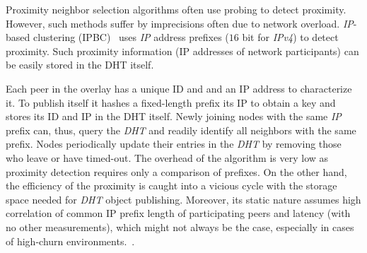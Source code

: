 Proximity neighbor selection algorithms often use probing to detect proximity. 
However, such methods suffer by imprecisions often due to network overload.
{\sl IP}-based clustering (IPBC)~\cite{KM2007} uses {\sl IP} address prefixes
($16$ bit for {\sl IPv4}) to detect proximity.
Such proximity information (IP addresses of network participants) can be
easily stored in the DHT itself.

Each peer in the overlay has a unique ID and and an IP address to
characterize it. To publish itself it hashes a fixed-length prefix
its IP to obtain a key and stores its ID and IP in the DHT itself. 
Newly joining nodes with the same {\sl IP} prefix 
can, thus, query the \emph{DHT} and readily identify all neighbors with the
same prefix. Nodes periodically update their entries in the \emph{DHT} 
by removing those who leave or have timed-out.
The overhead of the algorithm is very low as proximity detection requires only
a comparison of prefixes. On the other hand, the efficiency of the proximity
is caught into a vicious cycle with the storage space needed for \emph{DHT} 
object publishing.
Moreover, its static nature assumes high correlation of common IP prefix
length of participating peers and latency (with no other measurements),
which might not always be the case, especially in cases of high-churn
environments.~\cite{EWF2011}.
%
%
